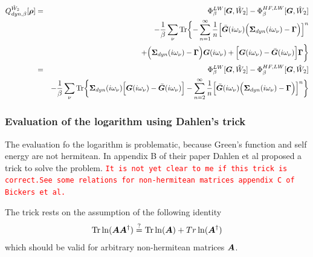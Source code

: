 \documentclass[11pt,a4paper]{report}
\newcommand{\petertt}[1]{\textcolor{red}{\texttt{#1}}}
\begin{document}
\begin{eqnarray}
Q^{\hat{W}_2}_{dyn,\beta}[\bm{\rho}]
&=&
\Phi^{LW}_\beta[\bm{G},\hat{W}_2]-\Phi^{HF,LW}_\beta[\bm{G},\hat{W}_2]
\nonumber\\
&&-\frac{1}{\beta}\sum_\nu\mathrm{Tr}\biggl\lbrace
-\sum_{n=1}^\infty\frac{1}{n}
\Bigl[\bar{\bm{G}}(i\omega_\nu)
\Bigl(\bm{\Sigma}_{dyn}(i\omega_\nu)-\bm{\Gamma}\Bigr)
\Bigr]^n
\nonumber\\&&
+\Bigl(\bm{\Sigma}_{dyn}(i\omega_\nu)-\bm{\Gamma}\Bigr)\bm{G}(i\omega_\nu)
+
\Bigl[\bm{G}(i\omega_\nu)-\bar{\bm{G}}(i\omega_\nu)\Bigr]
\bm{\Gamma}
\biggr\rbrace
\nonumber\\
&=&
\Phi^{LW}_\beta[\bm{G},\hat{W}_2]-\Phi^{HF,LW}_\beta[\bm{G},\hat{W}_2]
\nonumber\\
&&-\frac{1}{\beta}\sum_\nu\mathrm{Tr}\biggl\lbrace
\bm{\Sigma}_{dyn}(i\omega_\nu)
\Bigl[\bm{G}(i\omega_\nu)-\bar{\bm{G}}(i\omega_\nu)\Bigr]
-\sum_{n=2}^\infty\frac{1}{n}
\Bigl[\bar{\bm{G}}(i\omega_\nu)
\Bigl(\bm{\Sigma}_{dyn}(i\omega_\nu)-\bm{\Gamma}\Bigr)
\Bigr]^n
\biggr\rbrace
\nonumber\\
\label{eq:dmf1greenenergypower}
\end{eqnarray}

\subsubsection{Evaluation of the logarithm using Dahlen's trick}
\label{sec:dahlenstrick}
The evaluation fo the logarithm is problematic, because Green's
function and self energy are not hermitean. In appendix B of their
paper\cite{dahlen06_pra73_12511} Dahlen et al proposed a trick to
solve the problem. \petertt{It is not yet clear to me if this trick is
  correct.}\petertt{See some relations for non-hermitean matrices
  appendix C of Bickers et al.\cite{bickers89_ap193_206}}

The trick rests on the assumption of the following identity
\begin{eqnarray}
\mathrm{Tr}\ln(\bm{A}\bm{A}^\dagger)\stackrel{?}{=}
\mathrm{Tr}\ln(\bm{A})+Tr\ln(\bm{A}^\dagger)
\end{eqnarray}
which should be valid for arbitrary non-hermitean matrices $\bm{A}$.
\end{document}
